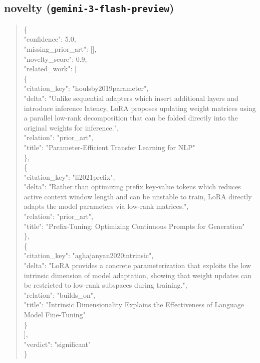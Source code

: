 \documentclass[11pt]{article}
\begin{document}
\subsection*{novelty (\texttt{gemini-3-flash-preview})}
\begin{quote}\small\ttfamily\raggedright
\{\\
  "confidence": 5.0,\\
  "missing\_prior\_art": [],\\
  "novelty\_score": 0.9,\\
  "related\_work": [\\
    \{\\
      "citation\_key": "houlsby2019parameter",\\
      "delta": "Unlike sequential adapters which insert additional layers and introduce inference latency, LoRA proposes updating weight matrices using a parallel low-rank decomposition that can be folded directly into the original weights for inference.",\\
      "relation": "prior\_art",\\
      "title": "Parameter-Efficient Transfer Learning for NLP"\\
    \},\\
    \{\\
      "citation\_key": "li2021prefix",\\
      "delta": "Rather than optimizing prefix key-value tokens which reduces active context window length and can be unstable to train, LoRA directly adapts the model parameters via low-rank matrices.",\\
      "relation": "prior\_art",\\
      "title": "Prefix-Tuning: Optimizing Continuous Prompts for Generation"\\
    \},\\
    \{\\
      "citation\_key": "aghajanyan2020intrinsic",\\
      "delta": "LoRA provides a concrete parameterization that exploits the low intrinsic dimension of model adaptation, showing that weight updates can be restricted to low-rank subspaces during training.",\\
      "relation": "builds\_on",\\
      "title": "Intrinsic Dimensionality Explains the Effectiveness of Language Model Fine-Tuning"\\
    \}\\
  ],\\
  "verdict": "significant"\\
\}\\
\end{quote}
\end{document}
